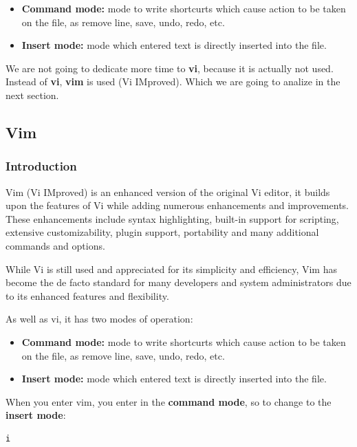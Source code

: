\documentclass{article}
\newenvironment{codetemplate}[1][]{%
  \mybasecolorbox[#1]
  \itshape
}{%
  \endmybasecolorbox
}
\begin{document}
\begin{itemize}
    \item \textbf{Command mode:} mode to write shortcurts which cause action to be taken on the file, as remove line, save, undo, redo, etc.
    \item \textbf{Insert mode:} mode which entered text is directly inserted into the file.
\end{itemize}

We are not going to dedicate more time to \textbf{vi}, because it is actually not used. Instead of \textbf{vi}, \textbf{vim} is used (Vi IMproved). Which we are going to analize in the next section.

\subsection{Vim}

\subsubsection{Introduction}

Vim (Vi IMproved) is an enhanced version of the original Vi editor, it builds upon the features of Vi while adding numerous enhancements and improvements. These enhancements include syntax highlighting, built-in support for scripting, extensive customizability, plugin support, portability and many additional commands and options.

While Vi is still used and appreciated for its simplicity and efficiency, Vim has become the de facto standard for many developers and system administrators due to its enhanced features and flexibility.

As well as vi, it has two modes of operation:

\begin{itemize}
    \item \textbf{Command mode:} mode to write shortcurts which cause action to be taken on the file, as remove line, save, undo, redo, etc.
    \item \textbf{Insert mode:} mode which entered text is directly inserted into the file.
\end{itemize}

When you enter vim, you enter in the \textbf{command mode}, so to change to the \textbf{insert mode}:

\begin{codetemplate}{}
\begin{verbatim}
i
\end{verbatim}
\end{codetemplate}
\end{document}
